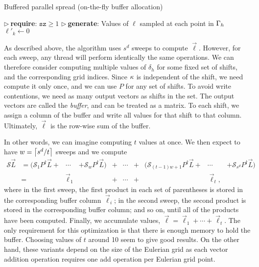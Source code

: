 \begin{algorithm}
\caption{Buffered parallel spread (on-the-fly buffer allocation)}
\label{algo:otf-spread}
\begin{algorithmic}[1]
\State $\triangleright\ $\textbf{require}: $\texttt{sz} \ge 1$
\State $\triangleright\ $\textbf{generate}: Values of $\ell$ sampled at each point in $\Gamma_h$
    \State $\ell'_k \gets 0$
\EndFor
\State \Return {} 
\EndProcedure {}
\end{algorithmic}
\end{algorithm}

As described above, the algorithm uses $s^d$ sweeps to compute $\vec{\ell}$.
However, for each sweep, any thread will perform identically the same
operations. We can therefore consider computing multiple values of $\delta_h$
for some fixed set of shifts, and the corresponding grid indices. Since $\kappa$
is independent of the shift, we need compute it only once, and we can use $P$
for any set of shifts. To avoid write contentions, we need as many output
vectors as shifts in the set. The output vectors are called the \emph{buffer},
and can be treated as a matrix. To each shift, we assign a column of the buffer
and write all values for that shift to that column.  Ultimately, $\vec{\ell}$
is the row-wise sum of the buffer.

In other words, we can imagine computing $t$ values at once. We then expect to 
have $w=\left\lceil{s^d/t}\right\rceil$ sweeps and we compute
\begin{equation}
    \label{eq:fused-sweeps}
    \begin{alignedat}{5}
        \mathcal{S}\vec{L} 
        &= (\mathcal{S}_1P^\dagger\vec{L} + &\cdots& + \mathcal{S}_wP^\dagger\vec{L})
        &+& \cdots
        &+& (\mathcal{S}_{(t-1)w+1}P^\dagger\vec{L} + &\cdots& + \mathcal{S}_{s^d}P^\dagger\vec{L}) \\
        &=& \vec{\ell}_1 &&+& \cdots &+&& \vec{\ell}_t, &
    \end{alignedat}
\end{equation}
where in the first sweep, the first product in each set of parentheses is
stored in the corresponding buffer column $\vec{\ell}_i$; in the second sweep,
the second product is stored in the corresponding buffer column; and so on,
until all of the products have been computed. Finally, we accumulate values,
$\vec{\ell} = \vec{\ell}_1 + \cdots + \vec{\ell}_t$. The only requirement for
this optimization is that there is enough memory to hold the buffer. Choosing
values of $t$ around 10 seem to give good results. On the other hand, these
variants depend on the size of the Eulerian grid as each vector addition
operation requires one add operation per Eulerian grid point.

